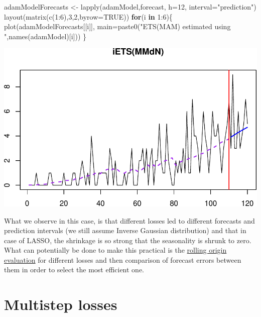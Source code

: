 \documentclass[
]{book}
\newenvironment{Shaded}{\begin{snugshade}}{\end{snugshade}}
\newcommand{\AttributeTok}[1]{\textcolor[rgb]{0.77,0.63,0.00}{#1}}
\newcommand{\ConstantTok}[1]{\textcolor[rgb]{0.00,0.00,0.00}{#1}}
\newcommand{\ControlFlowTok}[1]{\textcolor[rgb]{0.13,0.29,0.53}{\textbf{#1}}}
\newcommand{\DecValTok}[1]{\textcolor[rgb]{0.00,0.00,0.81}{#1}}
\newcommand{\FunctionTok}[1]{\textcolor[rgb]{0.00,0.00,0.00}{#1}}
\newcommand{\NormalTok}[1]{#1}
\newcommand{\OtherTok}[1]{\textcolor[rgb]{0.56,0.35,0.01}{#1}}
\newcommand{\SpecialCharTok}[1]{\textcolor[rgb]{0.00,0.00,0.00}{#1}}
\newcommand{\StringTok}[1]{\textcolor[rgb]{0.31,0.60,0.02}{#1}}
\theoremstyle{definition}
\theoremstyle{definition}
\theoremstyle{definition}
\theoremstyle{definition}
\theoremstyle{remark}
\begin{document}
\begin{Shaded}
\begin{Highlighting}[]
\NormalTok{adamModelForecasts }\OtherTok{\textless{}{-}} \FunctionTok{lapply}\NormalTok{(adamModel,forecast, }\AttributeTok{h=}\DecValTok{12}\NormalTok{, }\AttributeTok{interval=}\StringTok{"prediction"}\NormalTok{)}
\FunctionTok{layout}\NormalTok{(}\FunctionTok{matrix}\NormalTok{(}\FunctionTok{c}\NormalTok{(}\DecValTok{1}\SpecialCharTok{:}\DecValTok{6}\NormalTok{),}\DecValTok{3}\NormalTok{,}\DecValTok{2}\NormalTok{,}\AttributeTok{byrow=}\ConstantTok{TRUE}\NormalTok{))}
\ControlFlowTok{for}\NormalTok{(i }\ControlFlowTok{in} \DecValTok{1}\SpecialCharTok{:}\DecValTok{6}\NormalTok{)\{}
  \FunctionTok{plot}\NormalTok{(adamModelForecasts[[i]],}
       \AttributeTok{main=}\FunctionTok{paste0}\NormalTok{(}\StringTok{"ETS(MAM) estimated using "}\NormalTok{,}\FunctionTok{names}\NormalTok{(adamModel)[i]))}
\NormalTok{\}}
\end{Highlighting}
\end{Shaded}

\includegraphics{adam_files/figure-latex/unnamed-chunk-98-1.pdf}

What we observe in this case, is that different losses led to different forecasts and prediction intervals (we still assume Inverse Gaussian distribution) and that in case of LASSO, the shrinkage is so strong that the seasonality is shrunk to zero. What can potentially be done to make this practical is the \protect\hyperlink{rollingOrigin}{rolling origin evaluation} for different losses and then comparison of forecast errors between them in order to select the most efficient one.

\hypertarget{multistepLosses}{%
\section{Multistep losses}\label{multistepLosses}}
\end{document}

